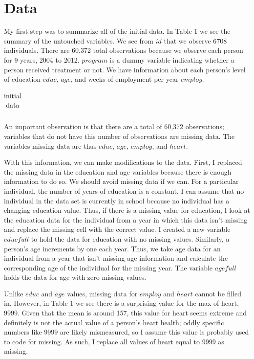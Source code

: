 \documentclass[a4paper]{article}
\begin{document}
\section{Data}
My first step was to summarize all of the initial data. In Table 1 we see the summary of the untouched variables. We see from $id$ that we observe 6708 individuals. There are 60,372 total observations because we observe each person for 9 years, 2004 to 2012. $program$ is a dummy variable indicating whether a person received treatment or not. We have information about each person's level of education $educ$, $age$, and weeks of employment per year $employ$.

\begin{table}[H]
\caption{initial data}
\centering
\begin{tabular}{|r|r|r|r|}

\end{tabular}
\end{table}

An important observation is that there are a total of 60,372 observations; variables that do not have this number of observations are missing data. The variables missing data are thus \(educ\), \(age\), \(employ\), and \(heart\). 

With this information, we can make modifications to the data. First, I replaced the missing data in the education and age variables because there is enough information to do so. We should avoid missing data if we can. For a particular individual, the number of years of education is a constant. I can assume that no individual in the data set is currently in school because no individual has a changing education value. Thus, if there is a missing value for education, I look at the education data for the individual from a year in which this data isn’t missing and replace the missing cell with the correct value. I created a new variable \(educfull\) to hold the data for education with no missing values. Similarly, a person’s age increments by one each year. Thus, we take age data for an individual from a year that isn’t missing age information and calculate the corresponding age of the individual for the missing year. The variable \(agefull\) holds the data for age with zero missing values. 

Unlike \(educ\) and \(age\) values, missing data for \(employ\) and \(heart\) cannot be filled in. However, in Table 1 we see there is a surprising value for the max of heart, 9999. Given that the mean is around 157, this value for heart seems extreme and definitely is not the actual value of a person's heart health; oddly specific numbers like 9999 are likely mismeasured, so I assume this value is probably used to code for missing. As such, I replace all values of heart equal to 9999 as missing. 
\end{document}

